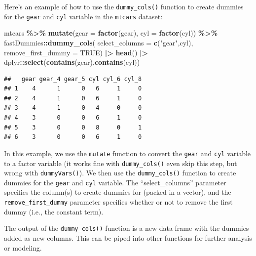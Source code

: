 \documentclass[
]{ctexart}
\newenvironment{Shaded}{\begin{snugshade}}{\end{snugshade}}
\newcommand{\AttributeTok}[1]{\textcolor[rgb]{0.13,0.29,0.53}{#1}}
\newcommand{\ConstantTok}[1]{\textcolor[rgb]{0.56,0.35,0.01}{#1}}
\newcommand{\FunctionTok}[1]{\textcolor[rgb]{0.13,0.29,0.53}{\textbf{#1}}}
\newcommand{\NormalTok}[1]{#1}
\newcommand{\SpecialCharTok}[1]{\textcolor[rgb]{0.81,0.36,0.00}{\textbf{#1}}}
\newcommand{\StringTok}[1]{\textcolor[rgb]{0.31,0.60,0.02}{#1}}
\begin{document}
Here's an example of how to use the \texttt{dummy\_cols()} function to
create dummies for the \texttt{gear} and \texttt{cyl} variable in the
\texttt{mtcars} dataset:

\begin{Shaded}
\begin{Highlighting}[]
\NormalTok{mtcars }\SpecialCharTok{\%\textgreater{}\%}
  \FunctionTok{mutate}\NormalTok{(}\AttributeTok{gear =} \FunctionTok{factor}\NormalTok{(gear),}
         \AttributeTok{cyl =} \FunctionTok{factor}\NormalTok{(cyl)) }\SpecialCharTok{\%\textgreater{}\%}
\NormalTok{  fastDummies}\SpecialCharTok{::}\FunctionTok{dummy\_cols}\NormalTok{(}
    \AttributeTok{select\_columns =} \FunctionTok{c}\NormalTok{(}\StringTok{"gear"}\NormalTok{,}\StringTok{\textquotesingle{}cyl\textquotesingle{}}\NormalTok{), }
    \AttributeTok{remove\_first\_dummy =} \ConstantTok{TRUE}\NormalTok{) }\SpecialCharTok{|\textgreater{}}
  \FunctionTok{head}\NormalTok{() }\SpecialCharTok{|\textgreater{}}
\NormalTok{  dplyr}\SpecialCharTok{::}\FunctionTok{select}\NormalTok{(}\FunctionTok{contains}\NormalTok{(}\StringTok{\textquotesingle{}gear\textquotesingle{}}\NormalTok{),}\FunctionTok{contains}\NormalTok{(}\StringTok{\textquotesingle{}cyl\textquotesingle{}}\NormalTok{))}
\end{Highlighting}
\end{Shaded}

\begin{verbatim}
##   gear gear_4 gear_5 cyl cyl_6 cyl_8
## 1    4      1      0   6     1     0
## 2    4      1      0   6     1     0
## 3    4      1      0   4     0     0
## 4    3      0      0   6     1     0
## 5    3      0      0   8     0     1
## 6    3      0      0   6     1     0
\end{verbatim}

In this example, we use the \texttt{mutate} function to convert the
\texttt{gear} and \texttt{cyl} variable to a factor variable (it works
fine with \texttt{dummy\_cols()} even skip this step, but wrong with
\texttt{dummyVars()}). We then use the \texttt{dummy\_cols()} function
to create dummies for the \texttt{gear} and \texttt{cyl} variable. The
``select\_columns'' parameter specifies the column(s) to create dummies
for (packed in a vector), and the \texttt{remove\_first\_dummy}
parameter specifies whether or not to remove the first dummy (i.e., the
constant term).

The output of the \texttt{dummy\_cols()} function is a new data frame
with the dummies added as new columns. This can be piped into other
functions for further analysis or modeling.
\end{document}

